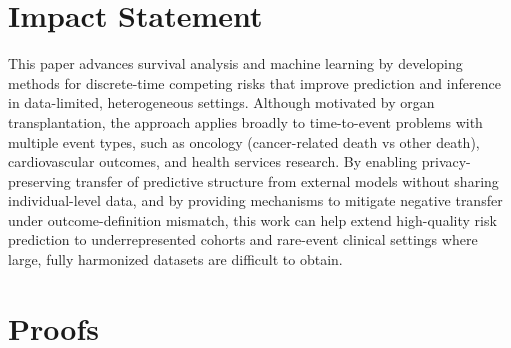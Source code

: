 \documentclass{article}
\theoremstyle{plain}
\theoremstyle{definition}
\theoremstyle{remark}
\begin{document}
\section*{Impact Statement}
This paper advances survival analysis and machine learning by developing methods for discrete-time competing risks that improve prediction and inference in data-limited, heterogeneous settings. Although motivated by organ transplantation, the approach applies broadly to time-to-event problems with multiple event types, such as oncology (cancer-related death vs other death), cardiovascular outcomes, and health services research. By enabling privacy-preserving transfer of predictive structure from external models without sharing individual-level data, and by providing mechanisms to mitigate negative transfer under outcome-definition mismatch, this work can help extend high-quality risk prediction to underrepresented cohorts and rare-event clinical settings where large, fully harmonized datasets are difficult to obtain.

\nocite{langley00}

% 



\newpage
\appendix
\onecolumn



\section{Proofs} \label{Proofs}


\end{document}
